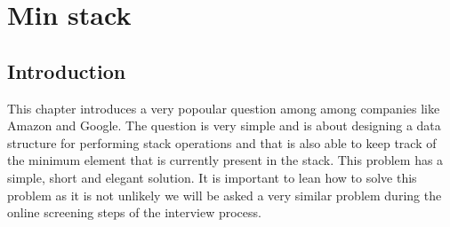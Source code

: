 %

\chapter{Min stack}
\label{ch:min_stack}
\section*{Introduction}
This chapter introduces a very popoular question among among companies like Amazon and Google. The question is very simple and is about designing a data structure for performing stack operations and that is also able to keep track of the minimum element that is currently present in the stack. This problem has a simple, short and elegant solution. It is important to lean how to solve this problem as it is not unlikely we will be asked a very similar problem during the online screening steps of the interview process.

